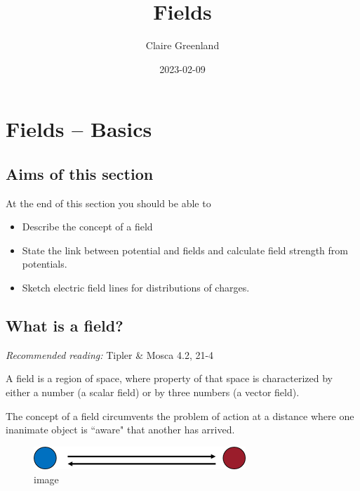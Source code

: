 \documentclass[
]{book}
\title{Fields}
\author{Claire Greenland}
\date{2023-02-09}
\begin{document}
\maketitle

{
\setcounter{tocdepth}{1}
\tableofcontents
}
\hypertarget{fields-basics}{%
\chapter{Fields -- Basics}\label{fields-basics}}

\hypertarget{aims-of-this-section}{%
\section*{Aims of this section}\label{aims-of-this-section}}

At the end of this section you should be able to

\begin{itemize}
\item
  Describe the concept of a field
\item
  State the link between potential and fields and calculate field
  strength from potentials.
\item
  Sketch electric field lines for distributions of charges.
\end{itemize}

\hypertarget{what-is-a-field}{%
\section{What is a field?}\label{what-is-a-field}}

\emph{Recommended reading:} Tipler \& Mosca 4.2, 21-4

A field is a region of space, where property of that space is
characterized by either a number (a scalar field) or by three numbers (a
vector field).

The concept of a field circumvents the problem of action at a distance
where one inanimate object is ``aware" that another has arrived.

\begin{figure}
\centering
\includegraphics[width=80mm,height=\textheight]{Figures/blue_red_circs.png}
\caption{image}
\end{figure}
\end{document}
